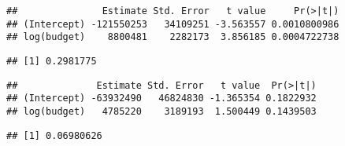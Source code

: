 \documentclass[
]{article}
\newenvironment{Shaded}{\begin{snugshade}}{\end{snugshade}}
\newcommand{\DecValTok}[1]{\textcolor[rgb]{0.00,0.00,0.81}{#1}}
\newcommand{\FunctionTok}[1]{\textcolor[rgb]{0.00,0.00,0.00}{#1}}
\newcommand{\NormalTok}[1]{#1}
\newcommand{\SpecialCharTok}[1]{\textcolor[rgb]{0.00,0.00,0.00}{#1}}
\begin{document}
\begin{Shaded}
\end{Shaded}

\begin{verbatim}
##               Estimate Std. Error   t value     Pr(>|t|)
## (Intercept) -121550253   34109251 -3.563557 0.0010800986
## log(budget)    8800481    2282173  3.856185 0.0004722738
\end{verbatim}

\begin{Shaded}
\end{Shaded}

\begin{verbatim}
## [1] 0.2981775
\end{verbatim}

\begin{Shaded}
\end{Shaded}

\begin{verbatim}
##              Estimate Std. Error   t value  Pr(>|t|)
## (Intercept) -63932490   46824830 -1.365354 0.1822932
## log(budget)   4785220    3189193  1.500449 0.1439503
\end{verbatim}

\begin{Shaded}
\end{Shaded}

\begin{verbatim}
## [1] 0.06980626
\end{verbatim}
\end{document}
